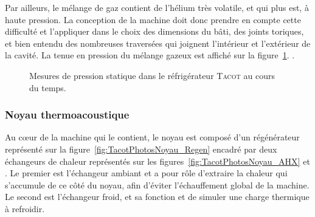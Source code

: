 Par ailleurs, le mélange de gaz contient de l'hélium très volatile, et qui plus est, à haute pression. La conception de la machine doit donc prendre en compte cette difficulté et l'appliquer dans le choix des dimensions du bâti, des joints toriques, et bien entendu des nombreuses traversées qui joignent l'intérieur et l'extérieur de la cavité. La tenue en pression du mélange gazeux est affiché sur la figure~\ref{fig:TenuePressionStatique}. .

\begin{figure}[!ht]
	\centering
	\externalremake
	
	\caption{Mesures de pression statique dans le réfrigérateur \textsc{Tacot} au cours du temps. }
	\label{fig:TenuePressionStatique}
\end{figure}


\subsubsection{Noyau thermoacoustique}
Au c\oe{}ur de la machine qui le contient, le noyau est composé d'un régénérateur représenté sur la figure~\ref{fig:TacotPhotosNoyau_Regen} encadré par deux échangeurs de chaleur représentés sur les figures~\ref{fig:TacotPhotosNoyau_AHX} et . Le premier est l'échangeur ambiant et a pour rôle d'extraire la chaleur qui s'accumule de ce côté du noyau, afin d'éviter l'échauffement global de la machine. Le second est l'échangeur froid, et sa fonction et de simuler une charge thermique à refroidir. 


